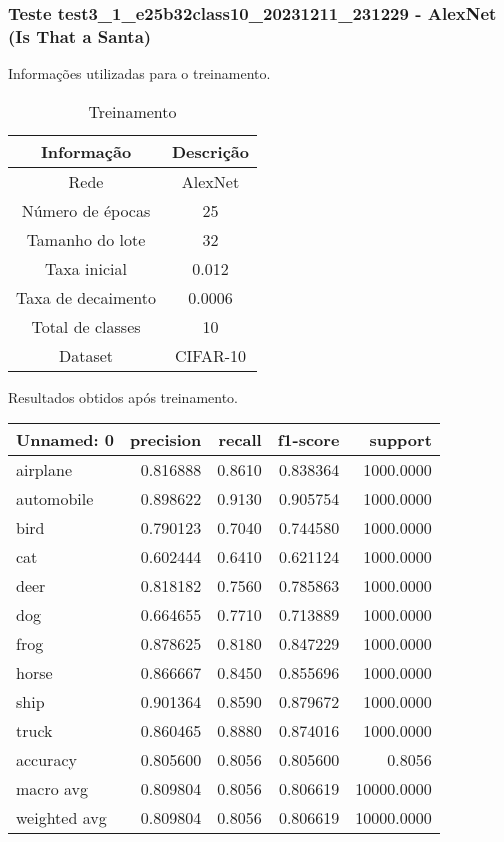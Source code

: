 \subsubsection{Teste test3_1_e25b32class10_20231211_231229 - AlexNet (Is That a Santa)}

Informações utilizadas para o treinamento.

\begin{table}[ht]
   \centering
   \caption{Treinamento}
   \label{tab:modelos}
   \begin{tabular}{| c | c | }
      \hline 
      \textbf{Informação} & \textbf{Descrição} \\
      \hline \hline 
      Rede & AlexNet \\
      \hline
      Número de épocas & 25\\
      \hline
      Tamanho do lote & 32\\
      \hline
      Taxa inicial & 0.012 \\
      \hline
      Taxa de decaimento & 0.0006 \\
      \hline
      Total de classes & 10\\
      \hline
      Dataset & CIFAR-10\\
      \hline
   \end{tabular} 
\end{table}

Resultados obtidos após treinamento.

\begin{tabular}{lrrrr}
\toprule
  Unnamed: 0 &  precision &  recall &  f1-score &    support \\
\midrule
    airplane &   0.816888 &  0.8610 &  0.838364 &  1000.0000 \\
  automobile &   0.898622 &  0.9130 &  0.905754 &  1000.0000 \\
        bird &   0.790123 &  0.7040 &  0.744580 &  1000.0000 \\
         cat &   0.602444 &  0.6410 &  0.621124 &  1000.0000 \\
        deer &   0.818182 &  0.7560 &  0.785863 &  1000.0000 \\
         dog &   0.664655 &  0.7710 &  0.713889 &  1000.0000 \\
        frog &   0.878625 &  0.8180 &  0.847229 &  1000.0000 \\
       horse &   0.866667 &  0.8450 &  0.855696 &  1000.0000 \\
        ship &   0.901364 &  0.8590 &  0.879672 &  1000.0000 \\
       truck &   0.860465 &  0.8880 &  0.874016 &  1000.0000 \\
    accuracy &   0.805600 &  0.8056 &  0.805600 &     0.8056 \\
   macro avg &   0.809804 &  0.8056 &  0.806619 & 10000.0000 \\
weighted avg &   0.809804 &  0.8056 &  0.806619 & 10000.0000 \\
\bottomrule
\end{tabular}


